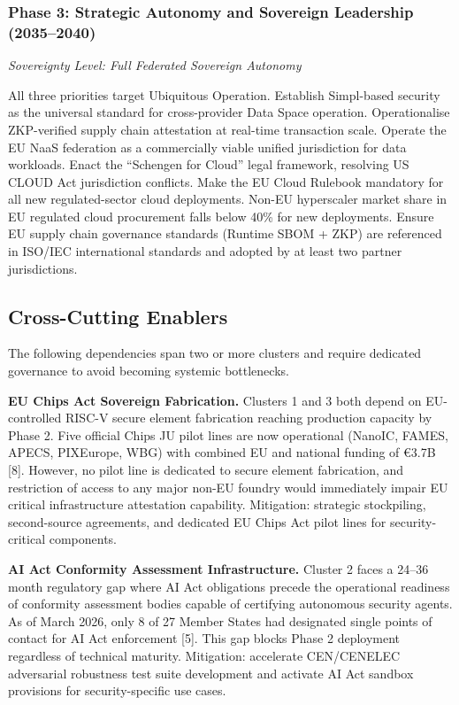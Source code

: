 \documentclass{ieeeaccess}
\begin{document}
\subsubsection{Phase 3: Strategic Autonomy and Sovereign Leadership
(2035--2040)}\label{phase-3-strategic-autonomy-and-sovereign-leadership-20352040-2}

\emph{Sovereignty Level: Full Federated Sovereign Autonomy}

All three priorities target Ubiquitous Operation. Establish Simpl-based
security as the universal standard for cross-provider Data Space
operation. Operationalise ZKP-verified supply chain attestation at
real-time transaction scale. Operate the EU NaaS federation as a
commercially viable unified jurisdiction for data workloads. Enact the
``Schengen for Cloud'' legal framework, resolving US CLOUD Act
jurisdiction conflicts. Make the EU Cloud Rulebook mandatory for all new
regulated-sector cloud deployments. Non-EU hyperscaler market share in
EU regulated cloud procurement falls below 40\% for new deployments.
Ensure EU supply chain governance standards (Runtime SBOM + ZKP) are
referenced in ISO/IEC international standards and adopted by at least
two partner jurisdictions.

\subsection{Cross-Cutting Enablers}\label{cross-cutting-enablers}

The following dependencies span two or more clusters and require
dedicated governance to avoid becoming systemic bottlenecks.

\textbf{EU Chips Act Sovereign Fabrication.} Clusters 1 and 3 both
depend on EU-controlled RISC-V secure element fabrication reaching
production capacity by Phase 2. Five official Chips JU pilot lines are
now operational (NanoIC, FAMES, APECS, PIXEurope, WBG) with combined EU
and national funding of €3.7B {[}8{]}. However, no pilot line is
dedicated to secure element fabrication, and restriction of access to
any major non-EU foundry would immediately impair EU critical
infrastructure attestation capability. Mitigation: strategic
stockpiling, second-source agreements, and dedicated EU Chips Act pilot
lines for security-critical components.

\textbf{AI Act Conformity Assessment Infrastructure.} Cluster 2 faces a
24--36 month regulatory gap where AI Act obligations precede the
operational readiness of conformity assessment bodies capable of
certifying autonomous security agents. As of March 2026, only 8 of 27
Member States had designated single points of contact for AI Act
enforcement {[}5{]}. This gap blocks Phase 2 deployment regardless of
technical maturity. Mitigation: accelerate CEN/CENELEC adversarial
robustness test suite development and activate AI Act sandbox provisions
for security-specific use cases.
\end{document}
